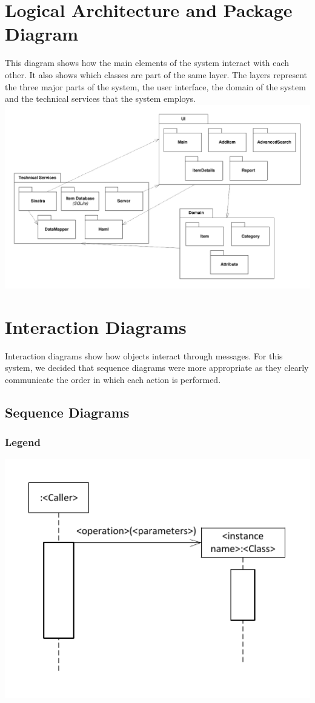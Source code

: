 \documentclass{article}
\begin{document}
\section{Logical Architecture and Package Diagram}
This diagram shows how the main elements of the system interact with each other.  It also shows which classes are part of the same layer.  The layers represent the three major parts of the system, the user interface, the domain of the system and the technical services that the system employs. \\
\includegraphics[keepaspectratio, width=6in]{package_diagram.pdf}\\

\section{Interaction Diagrams}
Interaction diagrams show how objects interact through messages.  For this system, we decided that sequence diagrams were more appropriate as they clearly communicate the order in which each action is performed.\\
\subsection{Sequence Diagrams}
\subsubsection{Legend}
\includegraphics[keepaspectratio, width=6in]{sd_legend.pdf}\\
\end{document}
